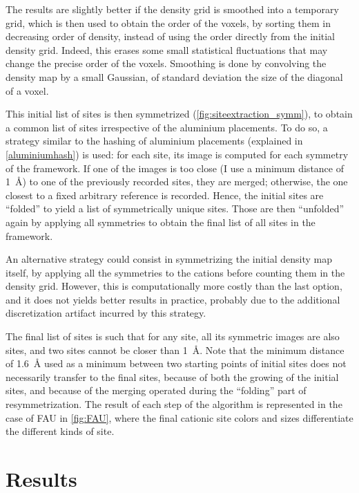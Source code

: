 \documentclass[main.tex]{subfiles}
\begin{document}
The results are slightly better if the density grid is smoothed into a temporary grid, which is then used to obtain the order of the voxels, by sorting them in decreasing order of density, instead of using the order directly from the initial density grid. Indeed, this erases some small statistical fluctuations that may change the precise order of the voxels. Smoothing is done by convolving the density map by a small Gaussian, of standard deviation the size of the diagonal of a voxel. 

This initial list of sites is then symmetrized (\cref{fig:siteextraction_symm}), to obtain a common list of sites irrespective of the aluminium placements. To do so, a strategy similar to the hashing of aluminium placements (explained in \cref{aluminiumhash}) is used: for each site, its image is computed for each symmetry of the framework. If one of the images is too close (I use a minimum distance of \qty{1}{\angstrom}) to one of the previously recorded sites, they are merged; otherwise, the one closest to a fixed arbitrary reference is recorded. Hence, the initial sites are ``folded'' to yield a list of symmetrically unique sites. Those are then ``unfolded'' again by applying all symmetries to obtain the final list of all sites in the framework.

An alternative strategy could consist in symmetrizing the initial density map itself, by applying all the symmetries to the cations before counting them in the density grid. However, this is computationally more costly than the last option, and it does not yields better results in practice, probably due to the additional discretization artifact incurred by this strategy.

The final list of sites is such that for any site, all its symmetric images are also sites, and two sites cannot be closer than \qty{1}{\angstrom}. Note that the minimum distance of \qty{1.6}{\angstrom} used as a minimum between two starting points of initial sites does not necessarily transfer to the final sites, because of both the growing of the initial sites, and because of the merging operated during the ``folding'' part of resymmetrization. The result of each step of the algorithm is represented in the case of FAU in \cref{fig:FAU}, where the final cationic site colors and sizes differentiate the different kinds of site.

\section{Results}
\end{document}
